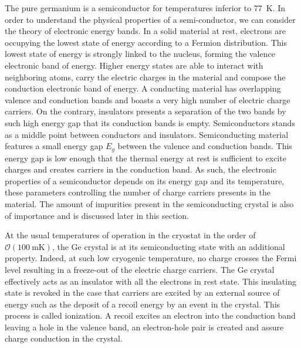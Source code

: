 The pure germanium is a semiconductor for temperatures inferior to \SI{77}{\kelvin}. In order to understand the physical properties of a semi-conductor, we can consider the theory of electronic energy bands. In a solid material at rest, electrons are occupying the lowest state of energy according to a Fermion distribution. This lowest state of energy is strongly linked to the nucleus, forming the valence electronic band of energy. Higher energy states are able to interact with neighboring atoms, carry the electric charges in the material and compose the conduction electronic band of energy. A conducting material has overlapping valence and conduction bands and boasts a very high number of electric charge carriers. On the contrary, insulators presents a separation of the two bands by such high energy gap that its conduction bands is empty. Semiconductors stands as a middle point between conductors and insulators. Semiconducting material features a small energy gap $E_g$ between the valence and conduction bands. This energy gap is low enough that the thermal energy at rest is sufficient to excite charges and creates carriers in the conduction band. As such, the electronic properties of a semiconductor depends on its energy gap and its temperature, these parameters controlling the number of charge carriers presents in the material. The amount of impurities present in the semiconducting crystal is also of importance and is discussed later in this section.

At the usual temperatures of operation in the cryostat in the order of $\mathcal{O}(\SI{100}{\milli\kelvin})$, the Ge crystal is at its semiconducting state with an additional property. Indeed, at such low cryogenic temperature, no charge crosses the Fermi level resulting in a freeze-out of the electric charge carriers. The Ge crystal effectively acts as an insulator with all the electrons in rest state. This insulating state is revoked in the case that carriers are excited by an external source of energy such as the deposit of a recoil energy by an event in the crystal. This process is called ionization. A recoil excites an electron into the conduction band leaving a hole in the valence band, an electron-hole pair is created and assure charge conduction in the crystal.

